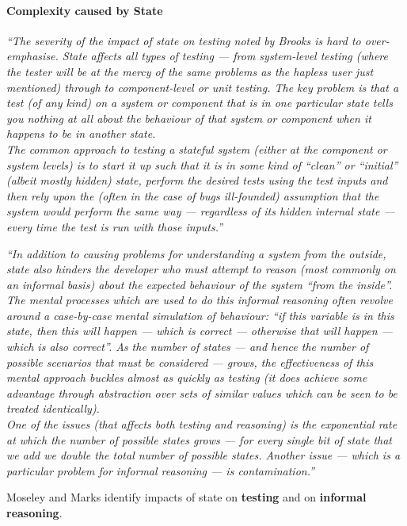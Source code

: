 \paragraph{Complexity caused by State}
\textit{``The severity of the impact of state on testing noted by Brooks is hard to over-emphasise. State affects all types of testing — from system-level testing (where the tester will be at the mercy of the same problems as the hapless user just mentioned) through to component-level or unit testing. The key problem is that a test (of any kind) on a system or component that is in one particular state tells you nothing at all about the behaviour of that system or component when it happens to be in another state. \\ The common approach to testing a stateful system (either at the component or system levels) is to start it up such that it is in some kind of “clean” or “initial” (albeit mostly hidden) state, perform the desired tests using the test inputs and then rely upon the (often in the case of bugs ill-founded) assumption that the system would perform the same way — regardless of its hidden internal state — every time the test is run with those inputs.''} \citep[p.~6]{outoftarpit}

\textit{``In addition to causing problems for understanding a system from the outside, state also hinders the developer who must attempt to reason (most commonly on an informal basis) about the expected behaviour of the system “from the inside”. \\ The mental processes which are used to do this informal reasoning often revolve around a case-by-case mental simulation of behaviour: “if this variable is in this state, then this will happen — which is correct — otherwise that will happen — which is also correct”. As the number of states — and hence the number of possible scenarios that must be considered — grows, the effectiveness of this mental approach buckles almost as quickly as testing (it does achieve some advantage through abstraction over sets of similar values which can be seen to be treated identically). \\ One of the issues (that affects both testing and reasoning) is the exponential rate at which the number of possible states grows — for every single bit of state that we add we double the total number of possible states. Another issue — which is a particular problem for informal reasoning — is contamination.''} \citep[p.~7]{outoftarpit}

Moseley and Marks identify impacts of state on \textbf{testing} and on \textbf{informal reasoning}.

